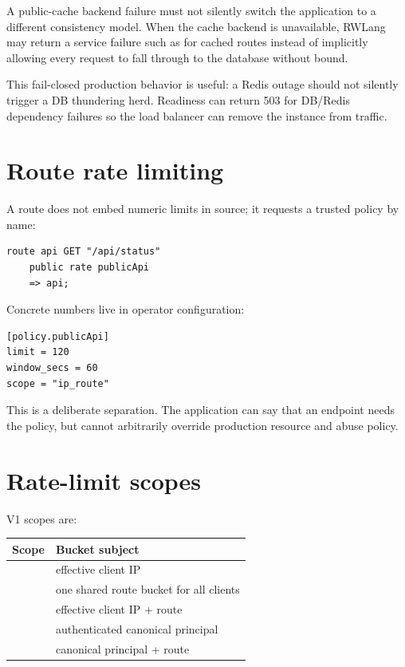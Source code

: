 A public-cache backend failure must not silently switch the application to a different consistency model. When the cache backend is unavailable, RWLang may return a service failure such as  for cached routes instead of implicitly allowing every request to fall through to the database without bound.

This fail-closed production behavior is useful: a Redis outage should not silently trigger a DB thundering herd. Readiness can return 503 for DB/Redis dependency failures so the load balancer can remove the instance from traffic.

\section{Route rate limiting}

A route does not embed numeric limits in source; it requests a trusted policy by name:

\begin{lstlisting}[language=RWLang]
route api GET "/api/status"
    public rate publicApi
    => api;
\end{lstlisting}

Concrete numbers live in operator configuration:

\begin{lstlisting}
[policy.publicApi]
limit = 120
window_secs = 60
scope = "ip_route"
\end{lstlisting}

This is a deliberate separation. The application can say that an endpoint needs the  policy, but cannot arbitrarily override production resource and abuse policy.

\section{Rate-limit scopes}

V1 scopes are:

\begin{center}
\begin{tabularx}{\textwidth}{@{}L{0.22\textwidth}Y@{}}
\toprule
\textbf{Scope} & \textbf{Bucket subject} \\
\midrule
{} & effective client IP \\
 & one shared route bucket for all clients \\
 & effective client IP + route \\
 & authenticated canonical principal \\
 & canonical principal + route \\
\bottomrule
\end{tabularx}
\end{center}

